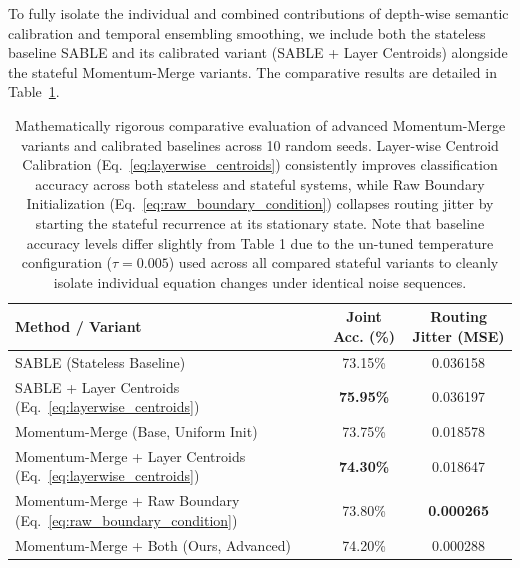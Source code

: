 \documentclass{article}
\theoremstyle{plain}
\theoremstyle{definition}
\theoremstyle{remark}
\begin{document}
    To fully isolate the individual and combined contributions of depth-wise semantic calibration and temporal ensembling smoothing, we include both the stateless baseline SABLE and its calibrated variant (SABLE + Layer Centroids) alongside the stateful Momentum-Merge variants. The comparative results are detailed in Table~\ref{tab:ablation_results}.

    \begin{table}[h]
    \centering
    \caption{Mathematically rigorous comparative evaluation of advanced Momentum-Merge variants and calibrated baselines across 10 random seeds. Layer-wise Centroid Calibration (Eq.~\ref{eq:layerwise_centroids}) consistently improves classification accuracy across both stateless and stateful systems, while Raw Boundary Initialization (Eq.~\ref{eq:raw_boundary_condition}) collapses routing jitter by starting the stateful recurrence at its stationary state. Note that baseline accuracy levels differ slightly from Table 1 due to the un-tuned temperature configuration ($\tau=0.005$) used across all compared stateful variants to cleanly isolate individual equation changes under identical noise sequences.}
    \label{tab:ablation_results}
    \vskip 0.1in
    \begin{tabular}{lcc}
    \toprule
    \textbf{Method / Variant} & \textbf{Joint Acc. (\%)} & \textbf{Routing Jitter (MSE)} \\
    \midrule
    SABLE (Stateless Baseline) & 73.15\% & 0.036158 \\
    SABLE + Layer Centroids (Eq.~\ref{eq:layerwise_centroids}) & \textbf{75.95\%} & 0.036197 \\
    \midrule
    Momentum-Merge (Base, Uniform Init) & 73.75\% & 0.018578 \\
    Momentum-Merge + Layer Centroids (Eq.~\ref{eq:layerwise_centroids}) & \textbf{74.30\%} & 0.018647 \\
    Momentum-Merge + Raw Boundary (Eq.~\ref{eq:raw_boundary_condition}) & 73.80\% & \textbf{0.000265} \\
    Momentum-Merge + Both (Ours, Advanced) & 74.20\% & 0.000288 \\
    \bottomrule
    \end{tabular}
    \end{table}
\end{document}
